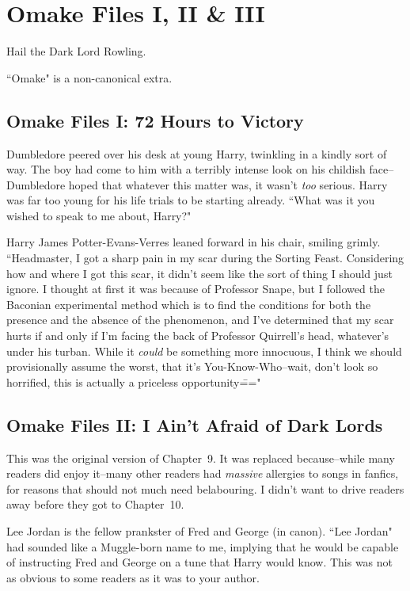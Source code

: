 \chapter{Omake Files I, II \& III}

\begin{chapterOpeningAuthorNote}
Hail the Dark Lord Rowling.

``Omake" is a non-canonical extra.
\end{chapterOpeningAuthorNote}

\section{Omake Files I: 72 Hours to Victory}

Dumbledore peered over his desk at young Harry, twinkling in a kindly sort of way. The boy had come to him with a terribly intense look on his childish face\---Dumbledore hoped that whatever this matter was, it wasn't \emph{too} serious. Harry was far too young for his life trials to be starting already. ``What was it you wished to speak to me about, Harry?"

Harry James Potter-Evans-Verres leaned forward in his chair, smiling grimly. ``Headmaster, I got a sharp pain in my scar during the Sorting Feast. Considering how and where I got this scar, it didn't seem like the sort of thing I should just ignore. I thought at first it was because of Professor Snape, but I followed the Baconian experimental method which is to find the conditions for both the presence and the absence of the phenomenon, and I've determined that my scar hurts if and only if I'm facing the back of Professor Quirrell's head, whatever's under his turban. While it \emph{could} be something more innocuous, I think we should provisionally assume the worst, that it's You-Know-Who\---wait, don't look so horrified, this is actually a priceless opportunity\==="

\section{Omake Files II: I Ain't Afraid of Dark Lords}

This was the original version of Chapter~9. It was replaced because\---while many readers did enjoy it\---many other readers had \emph{massive} allergies to songs in fanfics, for reasons that should not much need belabouring. I didn't want to drive readers away before they got to Chapter~10.

Lee Jordan is the fellow prankster of Fred and George (in canon). ``Lee Jordan" had sounded like a Muggle-born name to me, implying that he would be capable of instructing Fred and George on a tune that Harry would know. This was not as obvious to some readers as it was to your author.

